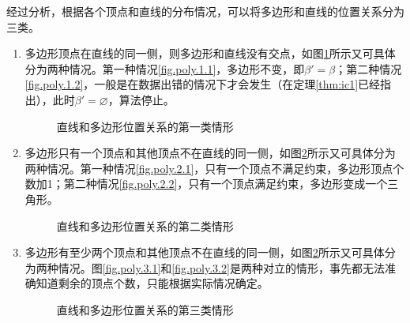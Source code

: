 经过分析，根据各个顶点和直线的分布情况，可以将多边形和直线的位置关系分为三类。
\begin{enumerate}
\item 多边形顶点在直线的同一侧，则多边形和直线没有交点，如图\ref{fig.3.beta.l.1}所示又可具体分为两种情况。第一种情况\ref{fig.poly.1.1}，多边形不变，即$\beta'=\beta$；第二种情况\ref{fig.poly.1.2}，一般是在数据出错的情况下才会发生（在定理\eqref{thm:ic1}已经指出），此时$\beta'=\varnothing$，算法停止。
\begin{figure}[htp]
	\centering
	\caption{直线和多边形位置关系的第一类情形}	 %
	\label{fig.3.beta.l.1}	 %
\end{figure}
\item 多边形只有一个顶点和其他顶点不在直线的同一侧，如图\ref{fig.3.beta.l.2}所示又可具体分为两种情况。第一种情况\ref{fig.poly.2.1}，只有一个顶点不满足约束，多边形顶点个数加1；第二种情况\ref{fig.poly.2.2}，只有一个顶点满足约束，多边形变成一个三角形。
\begin{figure}[htp]
	\centering
	\caption{直线和多边形位置关系的第二类情形}	 %
	\label{fig.3.beta.l.2}	 %
\end{figure}
\item 多边形有至少两个顶点和其他顶点不在直线的同一侧，如图\ref{fig.3.beta.l.2}所示又可具体分为两种情况。图\ref{fig.poly.3.1}和\ref{fig.poly.3.2}是两种对立的情形，事先都无法准确知道剩余的顶点个数，只能根据实际情况确定。
\begin{figure}[htp]
	\centering
	\caption{直线和多边形位置关系的第三类情形}	 %
	\label{fig.3.beta.l.3}	 %
\end{figure}
\end{enumerate}

